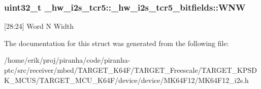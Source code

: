 \subsubsection[{\texorpdfstring{W\+NW}{WNW}}]{\setlength{\rightskip}{0pt plus 5cm}uint32\+\_\+t \+\_\+hw\+\_\+i2s\+\_\+tcr5\+::\+\_\+hw\+\_\+i2s\+\_\+tcr5\+\_\+bitfields\+::\+W\+NW}\hypertarget{struct__hw__i2s__tcr5_1_1__hw__i2s__tcr5__bitfields_a858f3ebf11e1d3a07373fcaafc40cd1a}{}\label{struct__hw__i2s__tcr5_1_1__hw__i2s__tcr5__bitfields_a858f3ebf11e1d3a07373fcaafc40cd1a}
\mbox{[}28\+:24\mbox{]} Word N Width 

The documentation for this struct was generated from the following file\+:\begin{DoxyCompactItemize}
\item 
/home/erik/proj/piranha/code/piranha-\/ptc/src/receiver/mbed/\+T\+A\+R\+G\+E\+T\+\_\+\+K64\+F/\+T\+A\+R\+G\+E\+T\+\_\+\+Freescale/\+T\+A\+R\+G\+E\+T\+\_\+\+K\+P\+S\+D\+K\+\_\+\+M\+C\+U\+S/\+T\+A\+R\+G\+E\+T\+\_\+\+M\+C\+U\+\_\+\+K64\+F/device/device/\+M\+K64\+F12/M\+K64\+F12\+\_\+i2s.\+h\end{DoxyCompactItemize}
